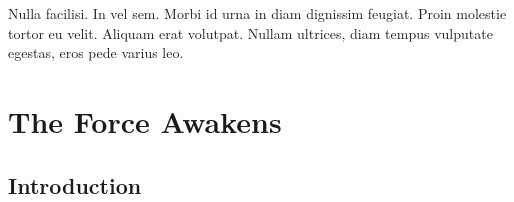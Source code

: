 \graphicspath{{figures/appendix/}}


\begin{savequote}[75mm]
Nulla facilisi. In vel sem. Morbi id urna in diam dignissim feugiat. Proin molestie tortor eu velit. Aliquam erat volutpat. Nullam    ultrices, diam tempus vulputate egestas, eros pede varius leo.
\end{savequote}

\chapter{The Force Awakens}
		\label{appendix-1}


\section{Introduction}

\lipsum[50-55]\cite{Lucas7}



